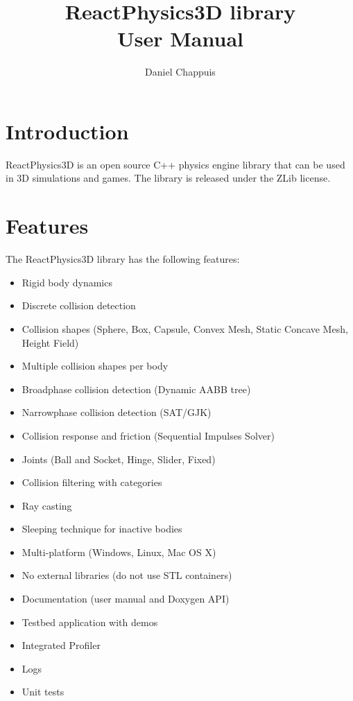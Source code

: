 \documentclass[a4paper,12pt]{article}
\begin{document}
   \author{Daniel Chappuis}
   \title{ReactPhysics3D library \\ User Manual}
   \maketitle

   \tableofcontents

   \newpage


   \section{Introduction}

  ReactPhysics3D is an open source C++ physics engine library that can be used
  in 3D simulations and games. The library is released under the ZLib license.

   \section{Features}

   The ReactPhysics3D library has the following features:

   \begin{itemize}
    \item Rigid body dynamics
    \item Discrete collision detection
    \item Collision shapes (Sphere, Box, Capsule, Convex Mesh, Static Concave Mesh, Height Field)
    \item Multiple collision shapes per body
    \item Broadphase collision detection (Dynamic AABB tree)
    \item Narrowphase collision detection (SAT/GJK)
    \item Collision response and friction (Sequential Impulses Solver)
    \item Joints (Ball and Socket, Hinge, Slider, Fixed)
    \item Collision filtering with categories
    \item Ray casting
    \item Sleeping technique for inactive bodies
    \item Multi-platform (Windows, Linux, Mac OS X)
    \item No external libraries (do not use STL containers)
    \item Documentation (user manual and Doxygen API)
    \item Testbed application with demos
    \item Integrated Profiler
    \item Logs
    \item Unit tests
   \end{itemize}
\end{document}
